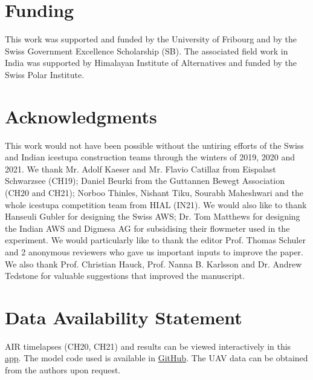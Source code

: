 \documentclass[utf8]{frontiersSCNS} %
\begin{document}
\section*{Funding} This work was supported and funded by the University of Fribourg and by the Swiss Government
Excellence Scholarship (SB). The associated field work in India was supported by Himalayan Institute of
Alternatives and funded by the Swiss Polar Institute.

\section*{Acknowledgments} This work would not have been possible without the untiring efforts of the Swiss and
Indian icestupa construction teams through the winters of 2019, 2020 and 2021. We thank Mr. Adolf Kaeser and Mr.
Flavio Catillaz from Eispalast Schwarzsee (CH19); Daniel Beurki from the Guttannen Bewegt Association (CH20 and
CH21); Norboo Thinles, Nishant Tiku, Sourabh Maheshwari and the whole icestupa competition team from HIAL (IN21).
We would also like to thank Hanseuli Gubler for designing the Swiss AWS; Dr. Tom Matthews for designing the Indian AWS
and Digmesa AG for subsidising their flowmeter used in the experiment.  We would particularly like to thank the
editor Prof. Thomas Schuler and 2 anonymous reviewers who gave us important inputs to improve the paper. We also
thank Prof. Christian Hauck, Prof.  Nanna B. Karlsson and Dr.  Andrew Tedstone for valuable suggestions that
improved the manuscript.

\section*{Data Availability Statement} AIR timelapses (CH20, CH21) and results can be viewed interactively in this
\href{https://share.streamlit.io/gayashiva/air_model/src/visualization/webApp.py}{app}.  The model code used is
available in \href{https://github.com/Gayashiva/air_model}{GitHub}. The UAV data can be obtained from the authors
upon request.

 
\end{document}
